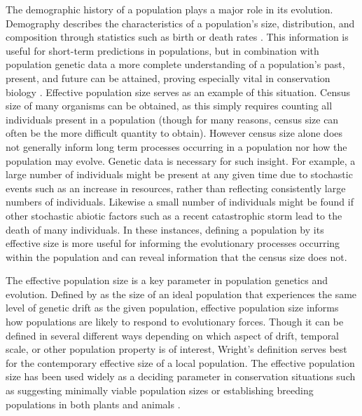 The demographic history of a population plays a major role in its evolution. Demography describes the characteristics of a population's size, distribution, and composition through statistics such as birth or death rates \citep{Pavlik:2000}. This information is useful for short-term predictions in populations, but in combination with population genetic data a more complete understanding of a population's past, present, and future can be attained, proving especially vital in conservation biology \citep{Lande:1988, Avise:1995, Nunney:1993}. Effective population size serves as an example of this situation. Census size of many organisms can be obtained, as this simply requires counting all individuals present in a population (though for many reasons, census size can often be the more difficult quantity to obtain). However census size alone does not generally inform long term processes occurring in a population nor how the population may evolve. Genetic data is necessary for such insight. For example, a large number of individuals might be present at any given time due to stochastic events such as an increase in resources, rather than reflecting consistently large numbers of individuals. Likewise a small number of individuals might be found if other stochastic abiotic factors such as a recent catastrophic storm lead to the death of many individuals. In these instances, defining a population by its effective size is more useful for informing the evolutionary processes occurring within the population and can reveal information that the census size does not. 

The effective population size is a key parameter in population genetics and evolution. Defined by \citet{Wright:1931} as the size of an ideal population that experiences the same level of genetic drift as the given population, effective population size informs how populations are likely to respond to evolutionary forces. Though it can be defined in several different ways depending on which aspect of drift, temporal scale, or other population property is of interest, Wright's definition serves best for the contemporary effective size of a local population. The effective population size has been used widely as a deciding parameter in conservation situations such as suggesting minimally viable population sizes or establishing breeding populations in both plants and animals \citep{Lande:1987, Soule:1987, Ellstrand:1993}.

